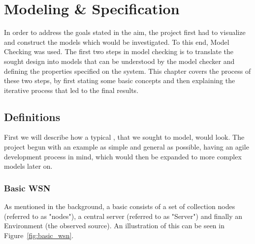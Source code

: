 \chapter{Modeling \& Specification}

In order to address the goals stated in the aim, the project first had to visualize and construct the models which would be investigated. To this end, Model Checking was used. The first two steps in model checking is to translate the sought design into models that can be understood by the model checker and defining the properties specified on the system. This chapter covers the process of these two steps, by first stating some basic concepts and then explaining the iterative process that led to the final results.

\section{Definitions}

First we will describe how a typical \wsn, that we sought to model, would look. The project begun with an example as simple and general as possible, having an agile development process in mind, which would then be expanded to more complex models later on. 



\subsection{Basic WSN}

As mentioned in the background, a basic \wsn consists of a set of collection nodes (referred to as "nodes"), a central server (referred to as "Server") and finally an Environment (the observed source). An illustration of this can be seen in Figure~\ref{fig:basic_wsn}. 


